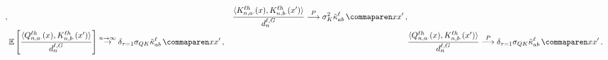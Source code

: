 \begin{lemma}
\begin{align}
        \, ,
        &&
        \frac{
            \langle \key{\sequenceVariable, a \cdot}{\depthSymbol \headIndex}(\inputSymbol) , \key{\sequenceVariable, b \cdot}{\depthSymbol \headIndex}(\inputSymbol') \rangle
        }{
            \logitDimension
        }
        \convergeProb
        \keyVar
        \kerntildef{a b}{\depthSymbol}{\inputSymbol}{\inputSymbol'}
        \, ,
        \\
        &
        \E \left[
            \frac{
                \langle \query{\sequenceVariable, a \cdot}{\depthSymbol \headIndex}(\inputSymbol) , \key{\sequenceVariable, b \cdot}{\depthSymbol \headIndex}(\inputSymbol') \rangle
            }{
                \logitDimension
            }
        \right]
        \overset{\sequenceVariable \to \infty}{\to}
        \delta_{\scaling = 1}
        \QKStd
        \kerntildef{a b}{\depthSymbol}{\inputSymbol}{\inputSymbol'}
        \, ,
        &&
        \frac{
            \langle \query{\sequenceVariable, a \cdot}{\depthSymbol \headIndex}(\inputSymbol) , \key{\sequenceVariable, b \cdot}{\depthSymbol \headIndex}(\inputSymbol') \rangle
        }{
            \logitDimension
        }
        \convergeProb
        \delta_{\scaling = 1}
        \QKStd
        \kerntildef{a b}{\depthSymbol}{\inputSymbol}{\inputSymbol'}
        \, .
    \end{align}
\end{lemma}

